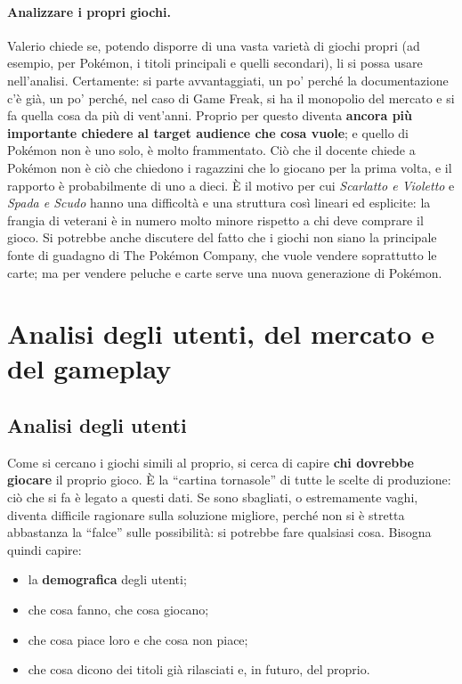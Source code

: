 \paragraph{Analizzare i propri giochi.} Valerio chiede se, potendo disporre di
una vasta varietà di giochi propri (ad esempio, per Pokémon, i titoli
principali e quelli secondari), li si possa usare nell'analisi. Certamente: si
parte avvantaggiati, un po' perché la documentazione c'è già, un po' perché,
nel caso di Game Freak, si ha il monopolio del mercato e si fa quella cosa da
più di vent'anni. Proprio per questo diventa \textbf{ancora più importante
chiedere al target audience che cosa vuole}; e quello di Pokémon non è uno
solo, è molto frammentato. Ciò che il docente chiede a Pokémon non è ciò che
chiedono i ragazzini che lo giocano per la prima volta, e il rapporto è
probabilmente di uno a dieci. È il motivo per cui \emph{Scarlatto e Violetto}
e \emph{Spada e Scudo} hanno una difficoltà e una struttura così lineari ed
esplicite: la frangia di veterani è in numero molto minore rispetto a chi
deve comprare il gioco. Si potrebbe anche discutere del fatto che i giochi
non siano la principale fonte di guadagno di The Pokémon Company, che vuole
vendere soprattutto le carte; ma per vendere peluche e carte serve una nuova
generazione di Pokémon.

\section{Analisi degli utenti, del mercato e del gameplay}
\label{sec:utenti-mercato}

\subsection{Analisi degli utenti}

Come si cercano i giochi simili al proprio, si cerca di capire \textbf{chi
dovrebbe giocare} il proprio gioco. È la ``cartina tornasole'' di tutte le
scelte di produzione: ciò che si fa è legato a questi dati. Se sono sbagliati,
o estremamente vaghi, diventa difficile ragionare sulla soluzione migliore,
perché non si è stretta abbastanza la ``falce'' sulle possibilità: si
potrebbe fare qualsiasi cosa. Bisogna quindi capire:
\begin{itemize}
  \item la \textbf{demografica} degli utenti;
  \item che cosa fanno, che cosa giocano;
  \item che cosa piace loro e che cosa non piace;
  \item che cosa dicono dei titoli già rilasciati e, in futuro, del proprio.
\end{itemize}

